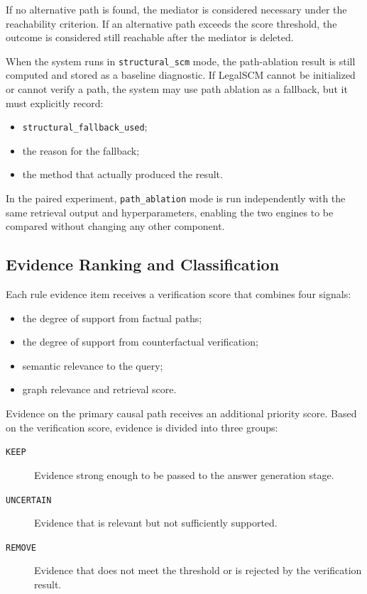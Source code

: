 If no alternative path is found, the mediator is considered necessary under
the reachability criterion. If an alternative path exceeds the score
threshold, the outcome is considered still reachable after the mediator is
deleted.

When the system runs in \texttt{structural\_scm} mode, the path-ablation
result is still computed and stored as a baseline diagnostic. If LegalSCM
cannot be initialized or cannot verify a path, the system may use path
ablation as a fallback, but it must explicitly record:

\begin{itemize}
    \item \texttt{structural\_fallback\_used};
    \item the reason for the fallback;
    \item the method that actually produced the result.
\end{itemize}

In the paired experiment, \texttt{path\_ablation} mode is run independently
with the same retrieval output and hyperparameters, enabling the two engines
to be compared without changing any other component.

\subsection{Evidence Ranking and Classification}

Each rule evidence item receives a verification score that combines four
signals:

\begin{itemize}
    \item the degree of support from factual paths;
    \item the degree of support from counterfactual verification;
    \item semantic relevance to the query;
    \item graph relevance and retrieval score.
\end{itemize}

Evidence on the primary causal path receives an additional priority score.
Based on the verification score, evidence is divided into three groups:

\begin{description}
    \item[\texttt{KEEP}] Evidence strong enough to be passed to the answer
    generation stage.

    \item[\texttt{UNCERTAIN}] Evidence that is relevant but not sufficiently
    supported.

    \item[\texttt{REMOVE}] Evidence that does not meet the threshold or is
    rejected by the verification result.
\end{description}

